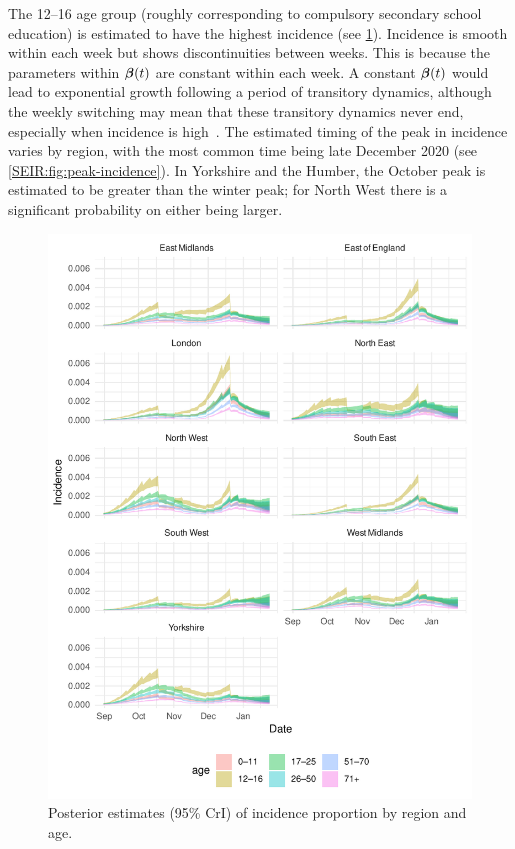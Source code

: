 \documentclass[thesis.tex]{subfiles}
\begin{document}
The 12--16 age group (roughly corresponding to compulsory secondary school education) is estimated to have the highest incidence (see \cref{SEIR:fig:incidence}).
Incidence is smooth within each week but shows discontinuities between weeks.
This is because the parameters within $\bm{\beta}(t)$ are constant within each week.
A constant $\bm{\beta}(t)$ would lead to exponential growth following a period of transitory dynamics, although the weekly switching may mean that these transitory dynamics never end, especially when incidence is high~\autocite{rhodesConvergence}.
The estimated timing of the peak in incidence varies by region, with the most common time being late December 2020 (see \cref{SEIR:fig:peak-incidence}).
In Yorkshire and the Humber, the October peak is estimated to be greater than the winter peak; for North West there is a significant probability on either being larger.
\begin{figure}
    \includegraphics{SEIR/CIS/incidence}
    \caption[Posterior estimates of incidence]{%
        Posterior estimates (95\% CrI) of incidence proportion by region and age.
    }
    \label{SEIR:fig:incidence}
\end{figure}
\end{document}
